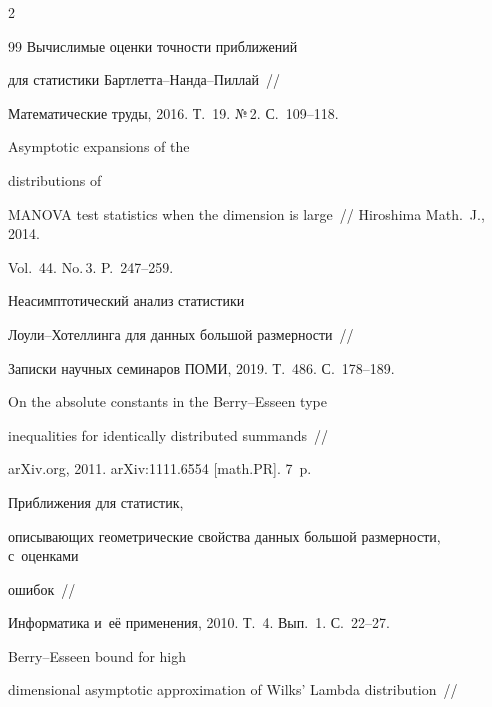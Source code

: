 \begin{multicols}{2}
{{\begin{thebibliography}{99}
 Вы\-чис\-ли\-мые оценки точ\-ности при\-бли\-же\-ний 


для статистики Барт\-лет\-та--Нан\-да--Пил\-лай~//


Математические труды, 2016. Т.~19. №\,2. С.~109--118.







  Asymptotic expansions of the 


distributions of


MANOVA test statistics when the dimension is large~// Hiroshima Math.~J., 2014. 


Vol.~44. No.\,3. P.~247--259.







 Неасимптотический анализ статистики 


Лоу\-ли--Хо\-тел\-лин\-га для данных большой раз\-мер\-ности~//


Записки научных семинаров \mbox{ПОМИ}, 2019. Т.~486. С.~178--189.







  On the absolute constants in the Berry--Esseen type 


inequalities for identically distributed summands~//


arXiv.org, 2011. arXiv:1111.6554 [math.PR]. 7~p.







  Приближения для статистик,


описывающих геометрические свойства данных большой размерности, с~оценками 


ошибок~//


Информатика и~её применения, 2010. Т.~4. Вып.~1. С.~22--27.







  Berry--Esseen bound for high 


dimensional asymptotic approximation of Wilks' Lambda distribution~//



\end{thebibliography}}}
\end{multicols}
